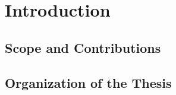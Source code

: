 \chapter{Introduction}
\label{chap:introduction}

\section{Scope and Contributions}
\label{sec:scope}

\section{Organization of the Thesis}
\label{sec:scope}